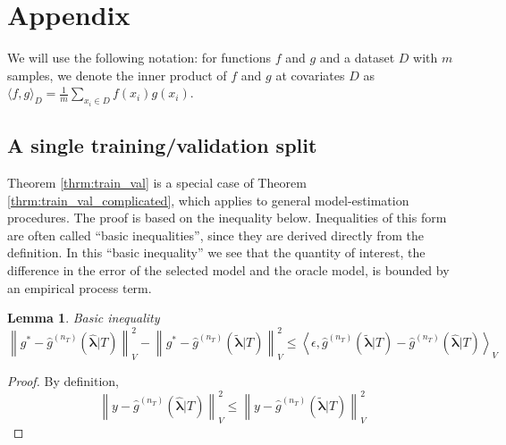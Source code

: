 \documentclass[12pt]{article}
\newtheorem{lemma}{Lemma}
\begin{document}
\appendix
\section{Appendix}\label{sec:proofs}

We will use the following notation: for functions $f$ and $g$ and a dataset $D$ with $m$ samples, we denote the inner product of $f$ and $g$ at covariates $D$ as $\langle f,g \rangle_{D} = \frac{1}{m} \sum_{x_i \in D} f(x_i) g(x_i) $.

\subsection{A single training/validation split}
\label{appendix:train_val}

Theorem \ref{thrm:train_val} is a special case of Theorem \ref{thrm:train_val_complicated}, which applies to general model-estimation procedures. The proof is based on the inequality below. Inequalities of this form are often called ``basic inequalities'', since they are derived directly from the definition. In this ``basic inequality'' we see that the quantity of interest, the difference in the error of the selected model and the oracle model, is bounded by an empirical process term.

\begin{lemma}{Basic inequality}
	\begin{equation}
	\label{thrm:basic_ineq}
	\left \| g^* - \hat{g}^{(n_T)}(\hat{\boldsymbol{\lambda}}|T) \right \|^2_V 
	- \left \| g^* - \hat{g}^{(n_T)}(\tilde{\boldsymbol{\lambda}}|T) \right \|^2_V
	\le 
	\left \langle \epsilon, \hat{g}^{(n_T)}(\tilde{\boldsymbol{\lambda}}|T) - \hat{g}^{(n_T)}(\hat{\boldsymbol{\lambda}}|T) \right \rangle_V
	\end{equation}
\end{lemma}

\begin{proof}
	By definition,
	\begin{equation}
	\left \| y - \hat{g}^{(n_T)}(\hat{\boldsymbol{\lambda}}|T) \right \|^2_V \le 
	\left \| y - \hat{g}^{(n_T)}(\tilde{\boldsymbol{\lambda}}|T) \right \|^2_V
	\end{equation}
\end{proof}
\end{document}
